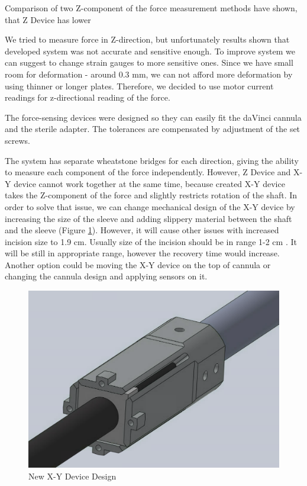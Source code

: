 	Comparison of two Z-component of the force measurement methods have shown, that Z Device has lower 
	
We tried to measure force in Z-direction, but unfortunately results shown that developed system was not accurate and sensitive enough. To improve system we can suggest to change strain gauges to more sensitive ones. Since we have small room for deformation - around 0.3 mm, we can not afford more deformation by using thinner or longer plates. Therefore, we decided to use motor current readings for z-directional reading of the force.

The force-sensing devices were designed so they can easily fit the daVinci cannula and the sterile adapter. The tolerances are compensated by adjustment of the set screws.

The system has separate wheatstone bridges for each direction, giving the ability to measure each component of the force independently. However, Z Device and X-Y device cannot work together at the same time, because created X-Y device takes the Z-component of the force and slightly restricts rotation of the shaft. In order to solve that issue, we can change mechanical design of the X-Y device by increasing the size of the sleeve and adding slippery material between the shaft and the sleeve (Figure \ref{fig:NewXYDesign}). However, it will cause other issues with increased incision size to 1.9 cm. Usually size of the incision should be in range 1-2 cm \cite{_laparoscopy}. It will be still in appropriate range, however the recovery time would increase. Another option could be moving the X-Y device on the top of cannula or changing the cannula design and applying sensors on it.

\begin{figure}[h]
	\begin{center}
		\includegraphics[width=120mm]{fig/methods/new_xy_dev.png}
	\end{center}
	\vspace{-4mm}
	\caption[New X-Y Device Design]
	{New X-Y Device Design}
	\label{fig:NewXYDesign}
	\vspace{-2mm}
\end{figure}
	
